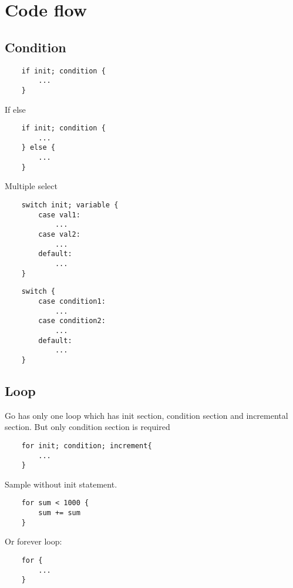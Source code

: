 \documentclass[12pt]{article}
\begin{document}
\newpage
\section{Code flow}
\label{sec:code-flow}

\begin{multicols}{2}
    \subsection{Condition}
    \begin{lstlisting}
    if init; condition {
        ...
    }
    \end{lstlisting}

    If else
    \begin{lstlisting}
    if init; condition {
        ...
    } else {
        ...
    }
    \end{lstlisting}

    Multiple select
    \begin{lstlisting}
    switch init; variable {
        case val1:
            ...
        case val2:
            ...
        default:
            ...
    }
    \end{lstlisting}

    \begin{lstlisting}
    switch {
        case condition1:
            ...
        case condition2:
            ...
        default:
            ...
    }
    \end{lstlisting}



    \subsection{Loop}
    \label{subsec:loop}
    Go has only one loop which has init section, condition section and incremental section.
    But only condition section is required

    \begin{lstlisting}
    for init; condition; increment{
        ...
    }
    \end{lstlisting}

    Sample without init statement.
    \begin{lstlisting}
    for sum < 1000 {
        sum += sum
    }
    \end{lstlisting}

    Or forever loop:
    \begin{lstlisting}
    for {
        ...
    }
    \end{lstlisting}


\end{multicols}
\end{document}

